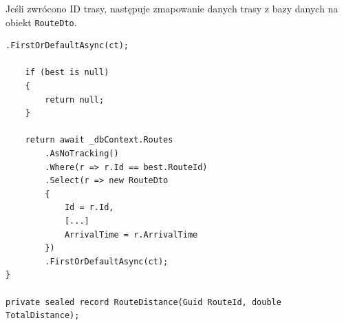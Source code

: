 Jeśli zwrócono ID trasy, następuje zmapowanie danych trasy z bazy danych na obiekt \texttt{RouteDto}.
\begin{lstlisting}[label=list:mapResultToRouteDto,caption=Mapowanie wyniku zapytania na obiekt RouteDto,style=sharpcstyle]
        .FirstOrDefaultAsync(ct);

    if (best is null)
    {
        return null;
    }

    return await _dbContext.Routes
        .AsNoTracking()
        .Where(r => r.Id == best.RouteId)
        .Select(r => new RouteDto
        {
            Id = r.Id,
            [...]
            ArrivalTime = r.ArrivalTime
        })
        .FirstOrDefaultAsync(ct);
}

private sealed record RouteDistance(Guid RouteId, double TotalDistance);
\end{lstlisting}
